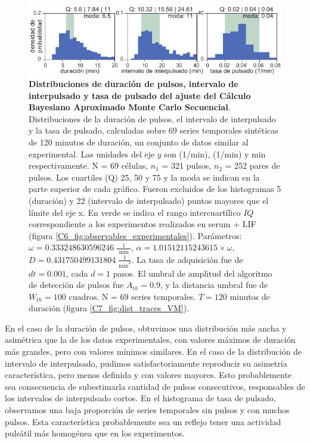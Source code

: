 \documentclass[./main.tex]{subfiles}
\begin{document}
\begin{figure}
    \centering
    \includegraphics[width=1\columnwidth]{figures/chapter6/C6_param_evaluation_hist.pdf} 
    \caption{\textbf{Distribuciones de duración de pulsos, intervalo de interpulsado y tasa de pulsado del ajuste del Cálculo Bayesiano Aproximado Monte Carlo Secuencial}. Distribuciones de la duración de pulsos, el intervalo de interpulsado y la tasa de pulsado, calculadas sobre 69 series temporales sintéticas de 120 minutos de duración, un conjunto de datos similar al experimental. Las unidades del eje $y$ son (1/min), (1/min) y min respectivamente. N = 69 células, $n_1$ = 321 pulsos, $n_2$ = 252 pares de pulsos. Los cuartiles (Q) 25, 50 y 75 y la moda se indican en la parte superior de cada gráfico. Fueron excluidos de los histogramas 5 (duración) y 22 (intervalo de interpulsado) puntos mayores que el límite del eje x. En verde se indica el rango intercuartílico $IQ$ correspondiente a los experimentos realizados en serum + LIF (figura \ref{C6_fig:observables_experimentales}). Parámetros:  $\omega = 0.333248630596246\;\frac{1}{\text{ min }}$, $\alpha = 1.01512115243615 \times \omega$, $ D = 0.431750499131804 \; \frac{1}{\text{min}^2}$. La tasa de adquisición fue de $dt = 0.001$, cada $d = 1$ pasos. El umbral de amplitud del algoritmo de detección de pulsos fue $A_{th} = 0.9$, y la distancia umbral fue de $W_{th} = 100\text{ cuadros}$. N = $69$ series temporales. $T = 120$ minutos de duración (figura \ref{C7_fig:dist_traces_VM}).}
    \label{C6_fig:dist_param_evaluation_hist}
\end{figure} 



En el caso de la duración de pulsos, obtuvimos una distribución más ancha y asimétrica que la de los datos experimentales, con valores máximos de duración más grandes, pero con valores mínimos similares. En el caso de la distribución de intervalo de interpulsado, pudimos satisfactoriamente reproducir su asimetría característica, pero menos definida y con valores mayores. Esto probablemente sea consecuencia de subestimarla cantidad de pulsos consecutivos, responsables de los intervalos de interpulsado cortos. En el histograma de tasa de pulsado, observamos una baja proporción de series temporales sin pulsos y con muchos pulsos. Esta característica probablemente sea un reflejo tener una actividad pulsátil más homogénea que en los experimentos. 
\end{document}
